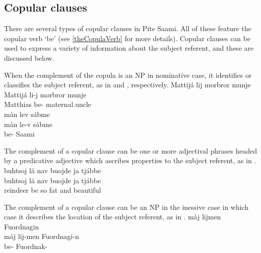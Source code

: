 \subsection{Copular clauses}\label{copulaClauses}
There are several types of copular clauses in Pite Saami. All of these feature the copular verb  ‘be’ %
(see \SEC\ref{theCopulaVerb} for more details). 
Copular clauses can be used to express a variety of information about the subject referent, and these are discussed below. 

When the complement of the copula is an NP in nominative case, it identifies or classifies the subject referent, as in  and , respectively.
\ea\label{copula1}
\glll	Mattijá lij morbror munje\\
	Mattijá li-j {morbror\footnotemark} munje\\
	Matthias\BS{} be- maternal.uncle\BS{} \\\nopagebreak
{} %
\z
\ea\label{copula2}
\glll	mån lev sábme\\
	mån le-v sábme\\
	 be- Saami\BS{}\\\nopagebreak
{} 
\z
{}

The complement of a copular clause can be one or more adjectival phrases headed by a predicative adjective which ascribes properties to the subject referent, as in .
\ea\label{copula3}
\glll	buhtsoj lä nav buojde ja tjábbe\\
	buhtsoj lä nav buojde ja tjábbe\\
	reindeer\BS{} be\BS{} so fat\BS{} and beautiful\BS{}\\\nopagebreak
{} 
\z

The complement of a copular clause can be an NP in the inessive case in which case it describes the location of the subject referent, as in .
\ea\label{copula4}
\glll	måj lijmen Fuordnagin\\
	måj lij-men Fuordnagi-n\\
	 be- Fuordnak-\\\nopagebreak
{} 
\z

